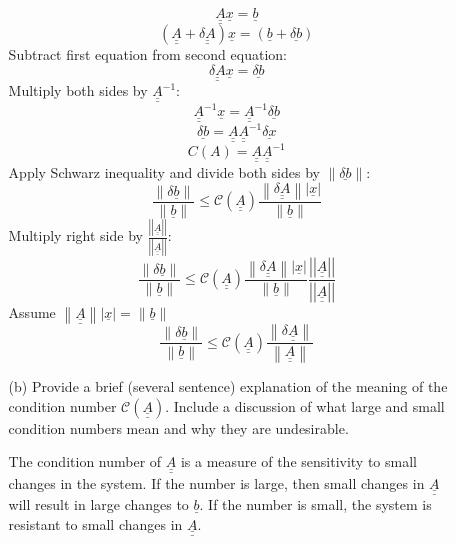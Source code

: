 \documentclass{article}
\begin{document}
\begin{enumerate}
\begin{itemize}
      \medskip
      
      $$\underline{\underline{A}} \underline{x} = \underline{b}$$
      $$(\underline{\underline{A}} + \underline{\underline{\delta A}}) \underline{x} = (\underline{b} + \underline{\delta b})$$
      Subtract first equation from second equation:
      $$\underline{\underline{\delta A}} \underline{x} = \underline{\delta b}$$
      Multiply both sides by $\underline{\underline{A}}^{-1}$:
      $$\underline{\underline{A}}^{-1} \underline{x} = \underline{\underline{A}}^{-1} \underline{\delta b}$$
      $$\underline{\delta b} = \underline{\underline{A}} \underline{\underline{A}}^{-1} \underline{\delta x}$$
      $$C(A) = \underline{\underline{A}} \underline{\underline{A}}^{-1}$$
      Apply Schwarz inequality and divide both sides by $\left\| \underline{\delta b} \right\|$:
      $$\frac{\left\| \delta \underline{b} \right\|}{ \left\| \underline{b} \right\| } \le   \mathcal{C} (\underline{\underline{A}}) \frac{ \left\| \underline{\underline{\delta A}}   \right\| \left| \underline{x} \right|}{\left\| \underline{b} \right\|}$$
      Multiply right side by $\frac{\left|\left| \underline{\underline{A}} \right|\right|}{\left|\left| \underline{\underline{A}} \right|\right|}$:
      $$\frac{\left\| \delta \underline{b} \right\|}{ \left\| \underline{b} \right\| } \le   \mathcal{C} (\underline{\underline{A}}) \frac{ \left\| \underline{\underline{\delta A}}   \right\| \left| \underline{x} \right|}{\left\| \underline{b} \right\|} \frac{\left|\left| \underline{\underline{A}} \right|\right|}{\left|\left| \underline{\underline{A}} \right|\right|}$$
      Assume $\left\| \underline{\underline{A}}   \right\| \left| \underline{x} \right| = \left\| \underline{b} \right\|$
      $$\boxed{ \frac{\left\| \delta \underline{b} \right\|}{ \left\| \underline{b} \right\| } \le   \mathcal{C} (\underline{\underline{A}}) \frac{ \left\| \delta \underline{\underline{A}}   \right\| }{\left\| \underline{\underline{A}} \right\|}}$$
      
            
    \item[(b)] Provide a brief (several sentence) explanation of the meaning of the condition number $\mathcal{C}(\underline{\underline{A}})$.  Include a discussion of what large and small condition numbers mean and why they are undesirable.  
    
    \medskip
    
     \quad The condition number of $\underline{\underline{A}}$ is a measure of the sensitivity to small changes in the system. If the number is large, then small changes in $\underline{\underline{A}}$ will result in large changes to $\underline{b}$. If the number is small, the system is resistant to small changes in $\underline{\underline{A}}$.
    \end{itemize}
    

\end{enumerate}
\end{document}
